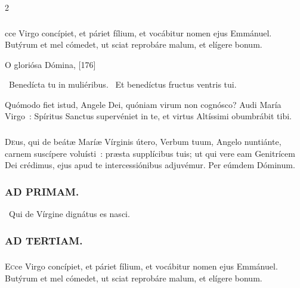 \documentclass[9pt,twoside]{extarticle}
\begin{document}
\begin{multicols}{2}
\subsubsection*{}
cce Virgo concípiet, et páriet fílium, et vocábitur nomen ejus Emmánuel. Butýrum et mel cómedet, ut sciat reprobáre malum, et elígere bonum.

\begin{tightlist}{}
\item {} O gloriósa Dómina,  [176]
\item {}~Benedícta tu in muliéribus. ~Et benedíctus fructus ventris tui.
\item {} Quómodo fiet istud, Angele Dei, quóniam virum non cognósco? Audi María Virgo~: Spíritus Sanctus supervéniet in te, et virtus Altíssimi obumbrábit tibi.
\end{tightlist}

\subsubsection*{\center {}}
\lettrine{D}eus, qui de beátæ Maríæ Vírginis útero, Verbum tuum, Angelo nuntiánte, carnem suscípere voluísti~: præsta supplícibus tuis; ut qui vere eam Genitrícem Dei crédimus, ejus apud te intercessiónibus adjuvémur. Per eúmdem Dóminum.

\begin{tightlist}{}
\item {}
\end{tightlist}

\subsubsection*{\center \textsc{AD PRIMAM.}}
\noindent {}~Qui de Vírgine dignátus es nasci.

\subsubsection*{\center \textsc{AD TERTIAM.}}
\subsubsection*{}
\lettrine{E}cce Virgo concípiet, et páriet fílium, et vocábitur nomen ejus Emmánuel. Butýrum et mel cómedet, ut sciat reprobáre malum, et elígere bonum.


\end{multicols}
\end{document}
